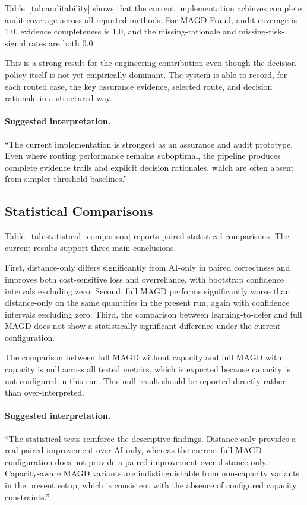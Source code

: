Table~\ref{tab:auditability} shows that the current implementation achieves complete audit coverage across all reported methods. For MAGD-Fraud, audit coverage is 1.0, evidence completeness is 1.0, and the missing-rationale and missing-risk-signal rates are both 0.0.

This is a strong result for the engineering contribution even though the decision policy itself is not yet empirically dominant. The system is able to record, for each routed case, the key assurance evidence, selected route, and decision rationale in a structured way.

\paragraph{Suggested interpretation.}
``The current implementation is strongest as an assurance and audit prototype. Even where routing performance remains suboptimal, the pipeline produces complete evidence trails and explicit decision rationales, which are often absent from simpler threshold baselines.''

\subsection{Statistical Comparisons}
\label{subsec:results_statistical_tests}

Table~\ref{tab:statistical_comparison} reports paired statistical comparisons. The current results support three main conclusions.

First, distance-only differs significantly from AI-only in paired correctness and improves both cost-sensitive loss and overreliance, with bootstrap confidence intervals excluding zero. Second, full MAGD performs significantly worse than distance-only on the same quantities in the present run, again with confidence intervals excluding zero. Third, the comparison between learning-to-defer and full MAGD does not show a statistically significant difference under the current configuration.

The comparison between full MAGD without capacity and full MAGD with capacity is null across all tested metrics, which is expected because capacity is not configured in this run. This null result should be reported directly rather than over-interpreted.

\paragraph{Suggested interpretation.}
``The statistical tests reinforce the descriptive findings. Distance-only provides a real paired improvement over AI-only, whereas the current full MAGD configuration does not provide a paired improvement over distance-only. Capacity-aware MAGD variants are indistinguishable from non-capacity variants in the present setup, which is consistent with the absence of configured capacity constraints.''

